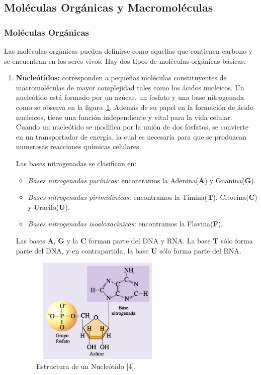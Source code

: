 \subsection{Moléculas Orgánicas y Macromoléculas}
\label{molOrg}

\subsubsection{Moléculas Orgánicas}
Las moléculas orgánicas pueden definirse como aquellas que contienen carbono y se encuentran en los seres vivos. Hay dos tipos de moléculas orgánicas básicas:
\begin{enumerate}
    \item \textbf{Nucleótidos:} corresponden a pequeñas moléculas constituyentes de macromoléculas
    de mayor complejidad tales como los ácidos nucleicos. Un nucleótido está formado por un azúcar, un
    fosfato y una base nitrogenada como se observa en la figura~\ref{nucleotido}. Además de su papel en la
    formación de ácido nucleicos, tiene una función independiente y vital para la vida celular.
    Cuando un nucleótido se modifica por la unión de dos fosfatos, se convierte en un transportador de
    energía, la cual es necesaria para que se produzcan numerosas reacciones químicas celulares.

    Las bases nitrogenadas se clasifican en:
	\begin{itemize}
	    \item \textit{Bases nitrogenadas purínicas:} encontramos la Adenina(\textbf{A}) y Guanina(\textbf{G}).
		\item \textit{Bases nitrogenadas pirimidínicas:} encontramos la Timina(\textbf{T}), Citocina(\textbf{C}) y Uracilo(\textbf{U}).
		\item \textit{Bases nitrogenadas isoaloxacínicas:} encontramos la Flavina(\textbf{F}).
	\end{itemize}
	Las bases \textbf{A}, \textbf{G} y la \textbf{C} forman parte del DNA y RNA. La base \textbf{T} sólo forma parte del DNA, y en contrapartida, la base \textbf{U} sólo forma parte del RNA.	
    \begin{figure} [!h]       
    	    \hspace*{4cm}\includegraphics[width=2.5209in,height=2.000in]{image/nucleotido.png}
    		\caption{Estructura de un Nucleótido [4].}			
    		\label{nucleotido}
    \end{figure}				


\end{enumerate}
